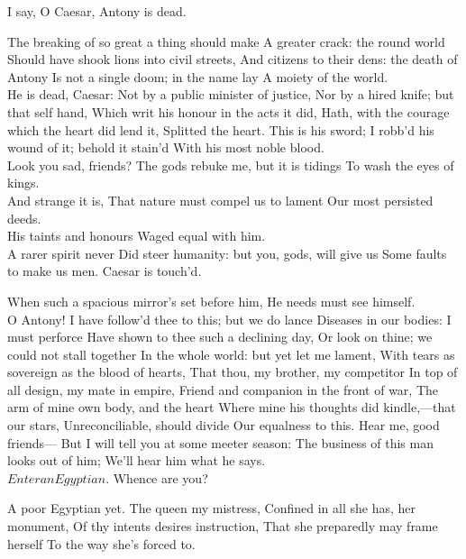 \documentclass{book}
\begin{document}
\8	I say, O Caesar, Antony is dead.

\3	The breaking of so great a thing should make
	A greater crack: the round world
	Should have shook lions into civil streets,
	And citizens to their dens: the death of Antony
	Is not a single doom; in the name lay
	A moiety of the world. \\

\8	He is dead, Caesar:
	Not by a public minister of justice,
	Nor by a hired knife; but that self hand,
	Which writ his honour in the acts it did,
	Hath, with the courage which the heart did lend it,
	Splitted the heart. This is his sword;
	I robb'd his wound of it; behold it stain'd
	With his most noble blood. \\

\3	Look you sad, friends?
	The gods rebuke me, but it is tidings
	To wash the eyes of kings. \\

\4	And strange it is,
	That nature must compel us to lament
	Our most persisted deeds. \\

	His taints and honours
	Waged equal with him. \\

\4	A rarer spirit never
	Did steer humanity: but you, gods, will give us
	Some faults to make us men. Caesar is touch'd.

	When such a spacious mirror's set before him,
	He needs must see himself. \\

\3	O Antony!
	I have follow'd thee to this; but we do lance
	Diseases in our bodies: I must perforce
	Have shown to thee such a declining day,
	Or look on thine; we could not stall together
	In the whole world: but yet let me lament,
	With tears as sovereign as the blood of hearts,
	That thou, my brother, my competitor
	In top of all design, my mate in empire,
	Friend and companion in the front of war,
	The arm of mine own body, and the heart
	Where mine his thoughts did kindle,---that our stars,
	Unreconciliable, should divide
	Our equalness to this. Hear me, good friends---
	But I will tell you at some meeter season:
	The business of this man looks out of him;
	We'll hear him what he says. \\
	\(Enter an Egyptian.\)
   Whence are you?

	A poor Egyptian yet. The queen my mistress,
	Confined in all she has, her monument,
	Of thy intents desires instruction,
	That she preparedly may frame herself
	To the way she's forced to. \\
\end{document}
